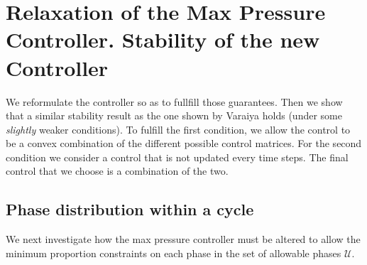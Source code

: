 \section{Relaxation of the Max Pressure Controller. Stability of the new Controller} \label{sec:immediatefeedback}




 



We reformulate the controller so as to fullfill those guarantees. 
Then we show that a similar stability result as the one shown by Varaiya holds (under some \emph{slightly} weaker conditions).
To fulfill the first condition, we allow the control to be a convex combination of the different possible control matrices.
For the second condition we consider a control that is not updated every time steps.
The final control that we choose is a combination of the two.







 




\subsection*{Phase distribution within a cycle}
We next investigate how the max pressure controller must be altered to allow the minimum proportion constraints on each phase in the set of allowable phases $\mathcal U$.

